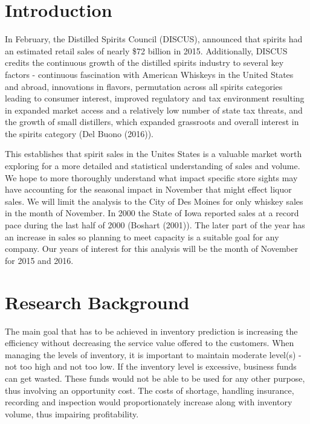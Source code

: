 \documentclass[]{elsarticle} %
\begin{document}
\section{Introduction}\label{introduction}

In February, the Distilled Spirits Council (DISCUS), announced that
spirits had an estimated retail sales of nearly \$72 billion in 2015.
Additionally, DISCUS credits the continuous growth of the distilled
spirits industry to several key factors - continuous fascination with
American Whiskeys in the United States and abroad, innovations in
flavors, permutation across all spirits categories leading to consumer
interest, improved regulatory and tax environment resulting in expanded
market access and a relatively low number of state tax threats, and the
growth of small distillers, which expanded grassroots and overall
interest in the spirits category (Del Buono (2016)).

This establishes that spirit sales in the Unites States is a valuable
market worth exploring for a more detailed and statistical understanding
of sales and volume. We hope to more thoroughly understand what impact
specific store sights may have accounting for the seasonal impact in
November that might effect liquor sales. We will limit the analysis to
the City of Des Moines for only whiskey sales in the month of November.
In 2000 the State of Iowa reported sales at a record pace during the
last half of 2000 (Boshart (2001)). The later part of the year has an
increase in sales so planning to meet capacity is a suitable goal for
any company. Our years of interest for this analysis will be the month
of November for 2015 and 2016.

\section{Research Background}\label{research-background}

The main goal that has to be achieved in inventory prediction is
increasing the efficiency without decreasing the service value offered
to the customers. When managing the levels of inventory, it is important
to maintain moderate level(s) - not too high and not too low. If the
inventory level is excessive, business funds can get wasted. These funds
would not be able to be used for any other purpose, thus involving an
opportunity cost. The costs of shortage, handling insurance, recording
and inspection would proportionately increase along with inventory
volume, thus impairing profitability.
\end{document}
